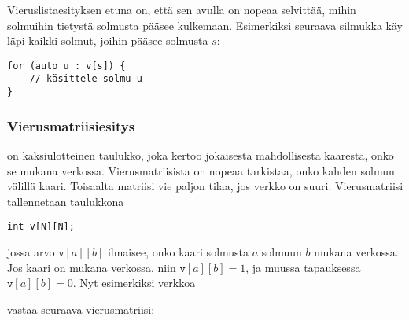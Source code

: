 Vieruslistaesityksen etuna on, että sen avulla on nopeaa selvittää,
mihin solmuihin tietystä solmusta pääsee kulkemaan.
Esimerkiksi seuraava silmukka käy läpi kaikki solmut,
joihin pääsee solmusta $s$:

\begin{lstlisting}
for (auto u : v[s]) {
    // käsittele solmu u
}
\end{lstlisting}

\subsubsection{Vierusmatriisiesitys}


 on kaksiulotteinen taulukko,
joka kertoo jokaisesta mahdollisesta kaaresta,
onko se mukana verkossa.
Vierusmatriisista on nopeaa tarkistaa,
onko kahden solmun välillä kaari.
Toisaalta matriisi vie paljon tilaa,
jos verkko on suuri.
Vierusmatriisi tallennetaan taulukkona

\begin{lstlisting}
int v[N][N];
\end{lstlisting}

jossa arvo $\texttt{v}[a][b]$ ilmaisee,
onko kaari solmusta $a$ solmuun $b$ mukana verkossa.
Jos kaari on mukana verkossa,
niin $\texttt{v}[a][b]=1$,
ja muussa tapauksessa $\texttt{v}[a][b]=0$.
Nyt esimerkiksi verkkoa
\begin{center}
\end{center}
vastaa seuraava vierusmatriisi:
\begin{center}
\end{center}

